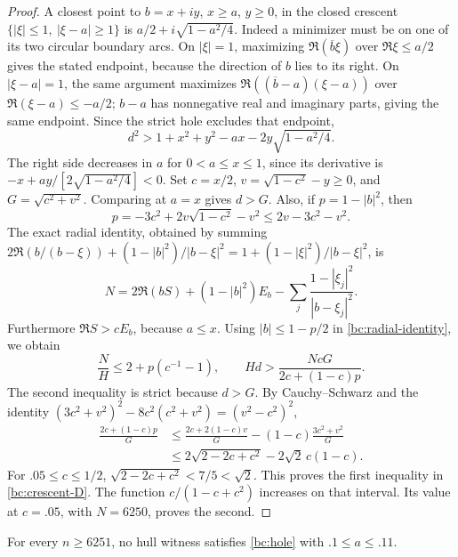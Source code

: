 \begin{proof}
A closest point to $b=x+iy$, $x\geq a$, $y\geq0$, in the closed
crescent $\{|\xi|\leq1,\ |\xi-a|\geq1\}$ is
$a/2+i\sqrt{1-a^2/4}$.  Indeed a minimizer must be on one of its
two circular boundary arcs.  On $|\xi|=1$, maximizing
$\Re(\overline b\xi)$ over $\Re\xi\leq a/2$ gives the stated
endpoint, because the direction of $b$ lies to its right.
On $|\xi-a|=1$, the same argument maximizes
$\Re((\overline b-a)(\xi-a))$ over
$\Re(\xi-a)\leq-a/2$; $b-a$ has nonnegative real and imaginary
parts, giving the same endpoint.  Since the strict hole excludes
that endpoint,
\[
 d^2>1+x^2+y^2-ax-2y\sqrt{1-a^2/4}.
\]
The right side decreases in $a$ for $0<a\leq x\leq1$, since its
derivative is $-x+ay/[2\sqrt{1-a^2/4}]<0$.
Set $c=x/2$, $v=\sqrt{1-c^2}-y\geq0$, and
$G=\sqrt{c^2+v^2}$.  Comparing at $a=x$ gives $d>G$.
Also, if $p=1-|b|^2$, then
\[
 p=-3c^2+2v\sqrt{1-c^2}-v^2\leq2v-3c^2-v^2.
\]
The exact radial identity, obtained by summing
$2\Re(b/(b-\xi))+(1-|b|^2)/|b-\xi|^2
=1+(1-|\xi|^2)/|b-\xi|^2$, is
\begin{equation}\label{bc:radial-identity}
 N=2\Re(bS)+(1-|b|^2)E_b
       -\sum_j\frac{1-|\xi_j|^2}{|b-\xi_j|^2}.
\end{equation}
Furthermore $\Re S>cE_b$, because $a\leq x$.
Using $|b|\leq1-p/2$ in \eqref{bc:radial-identity}, we obtain
\[
 \frac NH\leq2+p(c^{-1}-1),\qquad
 Hd>\frac{NcG}{2c+(1-c)p}.
\]
The second inequality is strict because $d>G$.
By Cauchy--Schwarz and the identity
$(3c^2+v^2)^2-8c^2(c^2+v^2)=(v^2-c^2)^2$,
\begin{align*}
 \frac{2c+(1-c)p}{G}
 &\leq\frac{2c+2(1-c)v}{G}
       -(1-c)\frac{3c^2+v^2}{G}\\
 &\leq2\sqrt{2-2c+c^2}-2\sqrt2\,c(1-c).
\end{align*}
For $.05\leq c\leq1/2$, $\sqrt{2-2c+c^2}<7/5<\sqrt2$.
This proves the first inequality in \eqref{bc:crescent-D}.
The function $c/(1-c+c^2)$ increases on that interval.
Its value at $c=.05$, with $N=6250$, proves the second.
\end{proof}

\begin{proposition}\label{bc:bridge}
For every $n\geq6251$, no hull witness satisfies
\eqref{bc:hole} with $.1\leq a\leq.11$.
\end{proposition}

